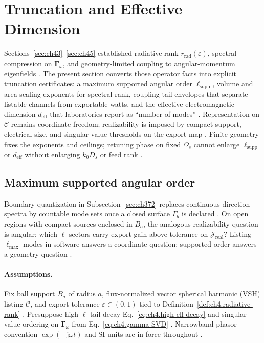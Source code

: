 ﻿\section{Truncation and Effective Dimension}
\label{sec:ch46}

Sections~\ref{sec:ch43}--\ref{sec:ch45} established radiative rank \(r_{\mathrm{rad}}(\varepsilon)\), spectral compression on
\(\boldsymbol{\Gamma}_\omega\), and geometry-limited coupling to angular-momentum eigenfields
\cite{stratton1941,harrington2001,devaney2004}. The present section converts those operator facts into explicit truncation
certificates: a maximum supported angular order \(\ell_{\mathrm{supp}}\), volume and area scaling exponents for spectral rank,
coupling-tail envelopes that separate listable channels from exportable watts, and the effective electromagnetic dimension
\(d_{\mathrm{eff}}\) that laboratories report as ``number of modes'' \cite{hansen1988,jackson1999}. Representation on
\(\mathcal{C}\) remains coordinate freedom; realizability is imposed by compact support, electrical size, and singular-value
thresholds on the export map \cite{stratton1941,collin2001}. Finite geometry fixes the exponents and ceilings; retuning phase on
fixed \(\Omega_{s}\) cannot enlarge \(\ell_{\mathrm{supp}}\) or \(d_{\mathrm{eff}}\) without enlarging \(k_{0}D_{s}\) or feed rank
\cite{devaney2004,hansen1988}.

\subsection{Maximum supported angular order}
\label{sec:ch461}

Boundary quantization in Subsection~\ref{sec:ch372} replaces continuous direction spectra by countable mode sets once a
closed surface \(\Gamma_{b}\) is declared \cite{stratton1941,harrington2001}. On open regions with compact sources enclosed in
\(B_{a}\), the analogous realizability question is angular: which \(\ell\) sectors carry export gain above tolerance on
\(\mathcal{J}_{\mathrm{real}}\)? Listing \(\ell_{\max}\) modes in software answers a coordinate question; supported order
answers a geometry question \cite{hansen1988,devaney2004,jackson1999}.

\paragraph{Assumptions.}
Fix ball support \(B_{a}\) of radius \(a\), flux-normalized vector spherical harmonic (VSH) listing \(\mathcal{C}\), and export
tolerance \(\varepsilon\in(0,1)\) tied to Definition~\ref{def:ch4.radiative-rank} \cite{stratton1941,hansen1988}. Presuppose
high-\(\ell\) tail decay Eq.~\eqref{eq:ch4.high-ell-decay} and singular-value ordering on \(\boldsymbol{\Gamma}_\omega\) from
Eq.~\eqref{eq:ch4.gamma-SVD} \cite{harrington2001,devaney2004}. Narrowband phasor convention \(\exp(-\mathrm{j}\omega t)\) and
SI units are in force throughout \cite{jackson1999,stratton1941}.

